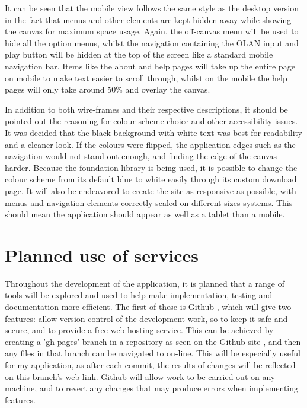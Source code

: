 It can be seen that the mobile view follows the same style as the desktop version in the fact that menus and other elements are kept hidden away while showing the canvas for maximum space usage. Again, the off-canvas menu will be used to hide all the option menus, whilst the navigation containing the OLAN input and play button will be hidden at the top of the screen like a standard mobile navigation bar. Items like the about and help pages will take up the entire page on mobile to make text easier to scroll through, whilst on the mobile the help pages will only take around 50\% and overlay the canvas. 

In addition to both wire-frames and their respective descriptions, it should be pointed out the reasoning for colour scheme choice and other accessibility issues. It was decided that the black background with white text was best for readability and a cleaner look. If the colours were flipped, the application edges such as the navigation would not stand out enough, and finding the edge of the canvas harder. Because the foundation library is being used, it is possible to change the colour scheme from its default blue to white easily through its custom download page. It will also be endeavored to create the site as responsive as possible, with menus and navigation elements correctly scaled on different sizes systems. This should mean the application should appear as well as a tablet than a mobile.

\section{Planned use of services}
Throughout the development of the application, it is planned that a range of tools will be explored and used to help make implementation, testing and documentation more efficient. The first of these is Github \cite{github}, which will give two features: allow version control of the development work, so to keep it safe and secure, and to provide a free web hosting service. This can be achieved by creating a 'gh-pages' branch in a repository as seen on the Github site \cite{pages}, and then any files in that branch can be navigated to on-line. This will be especially useful for my application, as after each commit, the results of changes will be reflected on this branch's web-link. Github will allow work to be carried out on any machine, and to revert any changes that may produce errors when implementing features.

